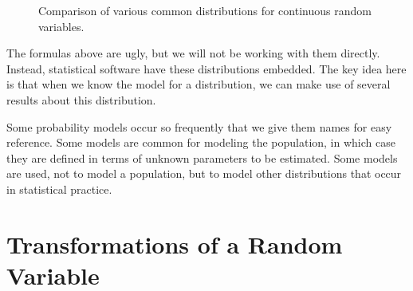 \documentclass[
  letterpaper,
  DIV=11,
  numbers=noendperiod]{scrreprt}
\theoremstyle{definition}
\theoremstyle{plain}
\theoremstyle{definition}
\theoremstyle{remark}
\begin{document}
\begin{figure}


\caption{\label{fig-randomvariables-comparisons}Comparison of various
common distributions for continuous random variables.}

\end{figure}%

The formulas above are ugly, but we will not be working with them
directly. Instead, statistical software have these distributions
embedded. The key idea here is that when we know the model for a
distribution, we can make use of several results about this
distribution.

\begin{tcolorbox}[enhanced jigsaw, rightrule=.15mm, leftrule=.75mm, opacityback=0, coltitle=black, bottomrule=.15mm, opacitybacktitle=0.6, left=2mm, colframe=quarto-callout-tip-color-frame, breakable, colback=white, arc=.35mm, toprule=.15mm, toptitle=1mm, bottomtitle=1mm, title=\textcolor{quarto-callout-tip-color}{\faLightbulb}\hspace{0.5em}{Big Idea}, titlerule=0mm, colbacktitle=quarto-callout-tip-color!10!white]

Some probability models occur so frequently that we give them names for
easy reference. Some models are common for modeling the population, in
which case they are defined in terms of unknown parameters to be
estimated. Some models are used, not to model a population, but to model
other distributions that occur in statistical practice.

\end{tcolorbox}

\section{Transformations of a Random
Variable}\label{transformations-of-a-random-variable}
\end{document}
